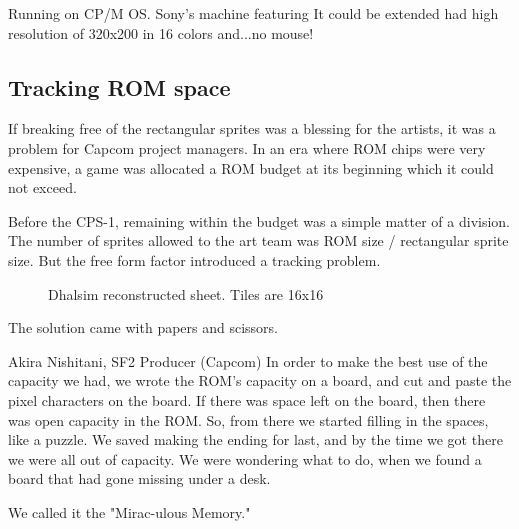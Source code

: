 Running on CP/M OS.
Sony's machine featuring  It could be extended had high resolution of 320x200 in 16 colors and...no mouse!

















\subsection{Tracking ROM space}

If breaking free of the rectangular sprites was a blessing for the artists, it was a problem for Capcom project managers. In an era where ROM chips were very expensive, a game was allocated a ROM budget at its beginning which it could not exceed.


Before the CPS-1, remaining within the budget was a simple matter of a division. The number of sprites allowed to the art team was ROM size / rectangular sprite size. But the free form factor introduced a tracking problem.



 \begin{figure}[H]
\caption*{Dhalsim reconstructed sheet. Tiles are 16x16}
\end{figure}

The solution came with papers and scissors.

\begin{q}{Akira Nishitani, SF2 Producer (Capcom)}
In order to make the best use of the capacity we had, we wrote the ROM’s capacity on a board, and cut and paste the pixel characters on the board. If there was space left on the board, then there was open capacity in the ROM. So, from there we started filling in the spaces, like a puzzle. We saved making the ending for last, and by the time we got there we were all out of capacity. We were wondering what to do, when we found a board that had gone missing under a desk.

We called it the "Mirac-ulous Memory."
\end{q}



